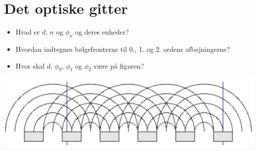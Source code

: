 \documentclass[a4paper, 12pt]{article}
\begin{document}
\vfill

\section*{Det optiske gitter}
\label{sec:orgb8189c3}
\begin{minipage}{0.3\linewidth}
\begin{itemize}
\item Hvad er \(d\), \(n\) og \(\phi_n\) og deres enheder?
\end{itemize}
\end{minipage}
\vline
\begin{minipage}{0.68\linewidth}

\end{minipage}


\vfill

\begin{minipage}{0.3\linewidth}
\begin{itemize}
\item Hvordan indtegnes bølgefronterne til 0., 1. og 2. ordens afbøjningerne?

\item Hvor skal \(d\), \(\phi_0\), \(\phi_1\) og \(\phi_2\) være på figuren?
\end{itemize}
\end{minipage}
\vline
\begin{minipage}{0.68\linewidth}
\begin{center}
\includegraphics[width=.9\linewidth]{./img/gitter.png}
\end{center}
\end{minipage}

\vfill
\end{document}
